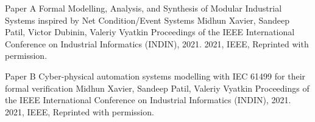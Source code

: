 \documentclass[12pt,a4paper,openright,final,twoside]{cseethesis}
\begin{document}

%
\startpapers


\def\paperheader{Paper A}
\def\papertitle{Formal Modelling, Analysis, and Synthesis of Modular Industrial Systems inspired by Net Condition/Event Systems}
\def\paperauthorstring{Midhun Xavier, Sandeep Patil, Victor Dubinin, Valeriy Vyatkin}
\def\referencestring{Proceedings of the IEEE International Conference on Industrial Informatics (INDIN), 2021.}
\def\copyrightstring{2021, IEEE, Reprinted with permission.}


\makepaperaccepted
  {\paperheader}
  {\papertitle}
  {\paperauthorstring}
  {\referencestring}
  {\copyrightstring}




\def\paperheader{Paper B}
\def\papertitle{Cyber-physical automation systems modelling with IEC 61499 for their formal verification}
\def\paperauthorstring{Midhun Xavier, Sandeep Patil, Valeriy Vyatkin}
\def\referencestring{Proceedings of the IEEE International Conference on Industrial Informatics (INDIN), 2021.}
\def\copyrightstring{2021, IEEE, Reprinted with permission.}


\makepaperaccepted
  {\paperheader}
  {\papertitle}
  {\paperauthorstring}
  {\referencestring}
  {\copyrightstring}


\def\paperheader{Paper C}
\def\papertitle{Formal verification of observers supervising a cyber-physical system implemented using IEC~61499}
\def\paperauthorstring{Polina Ovsiannikova, Etienne Le Priol, Vincent Perret, Pranay Jhunjhunwala, Midhun Xavier, and Valeriy Vyatkin}
\def\referencestring{Proceedings of the IEEE International Conference on Industrial Informatics (INDIN), 2021.}
\def\copyrightstring{2021, IEEE, Reprinted with permission.}
\end{document}
